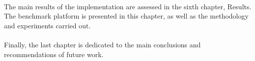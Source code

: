 \paragraph{}

The main results of the implementation are assessed in the sixth chapter, Results.
The benchmark platform is presented in this chapter, as well as the methodology and experiments carried out.

\paragraph{}

Finally, the last chapter is dedicated to the main conclusions and recommendations of future
work.

